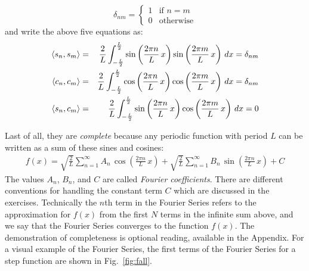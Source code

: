 \documentclass[12pt]{article}
\begin{document}
\begin{displaymath}
\delta_{nm} =  
\left\{
	\begin{array}{ll}
		1  & \mbox{if } n=m \\
		0 & \mbox{otherwise}
	\end{array}
\right.
\end{displaymath}
and write the above five equations as:
\begin{eqnarray}
\braket{s_n, s_m} &=& \frac{2}{L} \int_{-\frac{L}{2}}^{\frac{L}{2}} 
\sin\left(\frac{2\pi n}{L} \, x \right) \sin\left(\frac{2\pi m}{L} \, x \right) \, dx = \delta_{nm} \nonumber \\
\braket{c_n, c_m} &=& \frac{2}{L} \int_{-\frac{L}{2}}^{\frac{L}{2}} 
\cos\left(\frac{2\pi n}{L} \, x \right) \cos\left(\frac{2\pi m}{L} \, x \right) \, dx = \delta_{nm} \label{eqn:coscos} \\
\braket{s_n, c_m} &=& \frac{2}{L} \int_{-\frac{L}{2}}^{\frac{L}{2}} 
\sin\left(\frac{2\pi n}{L} \, x \right) \cos\left(\frac{2\pi m}{L} \, x \right) \, dx = 0 \nonumber
\end{eqnarray}


Last of all, they are {\em complete} because {any periodic function} with period $L$ can be written as a sum of these sines and cosines:
\begin{eqnarray}
f(x) = \sqrt{\frac{2}{L}} \sum_{n=1}^{\infty}  A_n \, \cos\left(\frac{2\pi n}{L} \, x \right) + \sqrt{\frac{2}{L}}  \sum_{n=1}^{\infty} B_n \, \sin\left(\frac{2\pi n}{L} \, x \right) + C\label{eqn:bigseries}
\end{eqnarray}
The values $A_n$, $B_n$,  and $C$ are called {\em Fourier coefficients}.   There are different conventions for handling the constant term $C$ which are discussed in the exercises.  Technically the $n$th term in the Fourier Series refers to the approximation for $f(x)$ from the first $N$ terms in the infinite sum above, and we say that the Fourier Series converges to the function $f(x)$.  The demonstration of completeness is optional reading, available in the Appendix.  For a visual example of the Fourier Series, the first terms of the Fourier Series for a step function are shown in Fig.~\ref{fig:fall}.  
\end{document}
